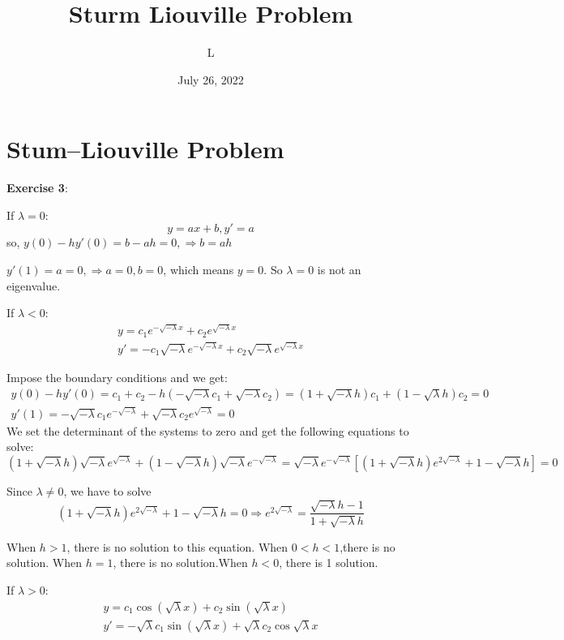\documentclass[11pt]{article}
\title{Sturm Liouville Problem}
\author{L}
\date{July 26, 2022}
\begin{document}
\maketitle

\section{Stum--Liouville Problem}

\textbf{Exercise 3}:

If $\lambda = 0$:
\begin{displaymath}
y = ax+b, y'=a
\end{displaymath}
so, $y(0)-hy'(0)=b-ah=0, \Longrightarrow b = ah$

$y'(1)=a=0, \Longrightarrow a = 0,b=0$, which means $y=0$. So $\lambda=0$ is not an eigenvalue.

If $\lambda <0$:
\begin{gather*}
y=c_1e^{-\sqrt{-\lambda}x} + c_2e^{\sqrt{-\lambda}x} \\
y'=-c_1\sqrt{-\lambda}e^{-\sqrt{-\lambda}x}  + c_2\sqrt{-\lambda}e^{\sqrt{-\lambda}x}
\end{gather*}

Impose the boundary conditions and we get:
\begin{gather*}
y(0)-hy'(0) = c_1+c_2-h(-\sqrt{-\lambda}c_1+\sqrt{-\lambda}c_2)=(1+\sqrt{-\lambda}h)c_1+(1-\sqrt{\lambda}h)c_2=0 \\
y'(1)=-\sqrt{-\lambda}c_1e^{-\sqrt{-\lambda}}+\sqrt{-\lambda}c_2e^{\sqrt{-\lambda}}=0
\end{gather*}
We set the determinant of the systems to zero and get the following equations to solve:
\begin{displaymath}
(1+\sqrt{-\lambda}h)\sqrt{-\lambda}e^{\sqrt{-\lambda}}+(1-\sqrt{-\lambda}h)\sqrt{-\lambda}e^{-\sqrt{-\lambda}}=\sqrt{-\lambda}e^{-\sqrt{-\lambda}}[(1+\sqrt{-\lambda}h)e^{2\sqrt{-\lambda}}+1-\sqrt{-\lambda}h]=0
\end{displaymath}

Since $\lambda \neq 0$, we have to solve \[(1+\sqrt{-\lambda}h)e^{2\sqrt{-\lambda}}+1-\sqrt{-\lambda}h=0 \Longrightarrow e^{2\sqrt{-\lambda}}=\frac{\sqrt{-\lambda}h-1}{1+\sqrt{-\lambda}h}\]

When $h > 1$, there is no solution to this equation. When $0 < h < 1$,there is no solution. When $h=1$, there is no solution.When $h < 0$, there is 1 solution.

If $\lambda > 0$:
\begin{gather*}
y=c_1\cos(\sqrt{\lambda}x)+c_2\sin(\sqrt{\lambda}x) \\
y' = -\sqrt{\lambda}c_1\sin(\sqrt{\lambda}x) + \sqrt{\lambda}c_2\cos{\sqrt{\lambda}x}
\end{gather*}
\end{document}
